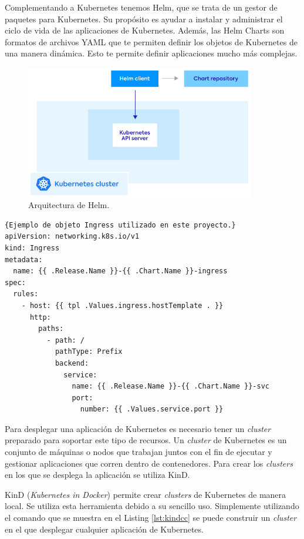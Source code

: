 Complementando a Kubernetes tenemos Helm, que se trata de un gestor de paquetes para Kubernetes. Su propósito es ayudar a instalar y administrar el ciclo de vida de las aplicaciones de Kubernetes. Además, las Helm Charts son formatos de archivos YAML que te permiten definir los objetos de Kubernetes de una manera dinámica. Esto te permite definir aplicaciones mucho más complejas.

\begin{figure}
  \centerline{\includegraphics[width=10cm]{figuras/helm}}
  \caption{Arquitectura de Helm.\cite{img:helm}}
  \label{fig:helm}
\end{figure}

\begin{lstlisting}[language=helm]{Ejemplo de objeto Ingress utilizado en este proyecto.}
apiVersion: networking.k8s.io/v1
kind: Ingress
metadata:
  name: {{ .Release.Name }}-{{ .Chart.Name }}-ingress
spec:
  rules:
    - host: {{ tpl .Values.ingress.hostTemplate . }}
      http:
        paths:
          - path: /
            pathType: Prefix
            backend:
              service:
                name: {{ .Release.Name }}-{{ .Chart.Name }}-svc
                port:
                  number: {{ .Values.service.port }}
\end{lstlisting}

Para desplegar una aplicación de Kubernetes es necesario tener un \textit{cluster} preparado para soportar este tipo de recursos. Un \textit{cluster} de Kubernetes es un conjunto de máquinas o nodos que trabajan juntos con el fin de ejecutar y gestionar aplicaciones que corren dentro de contenedores. Para crear los \textit{clusters} en los que se desplega la aplicación se utiliza KinD\cite{kind}.

KinD (\textit{Kubernetes in Docker}) permite crear \textit{clusters} de Kubernetes de manera local. Se utiliza esta herramienta debido a su sencillo uso. Simplemente utilizando el comando que se muestra en el Listing \ref{lst:kindcc} se puede construir un \textit{cluster} en el que desplegar cualquier aplicación de Kubernetes.

